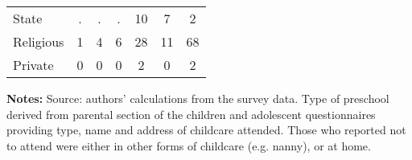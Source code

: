 \begin{table}[ht]
\begin{center}
\begin{tabular}{l ccc|ccc}
State           &   . &   . &   . &  10 &   7 &   2 \\ 
Religious       &   1 &   4 &   6 &  28 &  11 &  68 \\ 
Private         &   0 &   0 &   0 &   2 &   0 &   2 \\ \hline
\end{tabular}
\end{center}
\raggedright{\footnotesize {{\bfseries Notes:} Source: authors' calculations from the survey data. Type of preschool derived from parental section of the children and adolescent questionnaires providing type, name and address of childcare attended. Those who reported not to attend were either in other forms of childcare (e.g. nanny), or at home.} }
\end{table}
